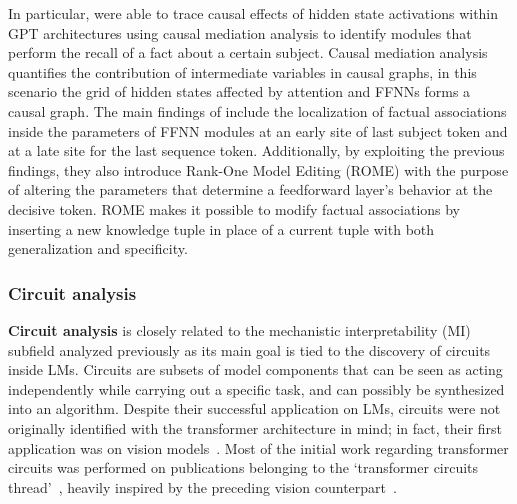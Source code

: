 In particular, \citet{meng2022} were able to trace causal effects of hidden state activations within GPT architectures using causal mediation analysis to identify modules that perform the recall of a fact about a certain subject.
Causal mediation analysis quantifies the contribution of intermediate variables in causal graphs, in this scenario the grid of hidden states affected by attention and FFNNs forms a causal graph.
The main findings of \citet{meng2022} include the localization of factual associations inside the parameters of FFNN modules at an early site of last subject token and at a late site for the last sequence token.
Additionally, by exploiting the previous findings, they also introduce Rank-One Model Editing (ROME) with the purpose of altering the parameters that determine a feedforward layer's behavior at the decisive token.
ROME makes it possible to modify factual associations by inserting a new knowledge tuple in place of a current tuple with both generalization and specificity.

\subsubsection{Circuit analysis}

\textbf{Circuit analysis} is closely related to the mechanistic interpretability (MI) subfield analyzed previously as its main goal is tied to the discovery of circuits inside LMs.
Circuits are subsets of model components that can be seen as acting independently while carrying out a specific task, and can possibly be synthesized into an algorithm.
Despite their successful application on LMs, circuits were not originally identified with the transformer architecture in mind; in fact, their first application was on vision models~\cite{cammarata2020}.
Most of the initial work regarding transformer circuits was performed on publications belonging to the `transformer circuits thread'~\cite{elhage2021,olsson2022,elhage2022,bricken2023}, heavily inspired by the preceding vision counterpart~\cite{cammarata2020}.


